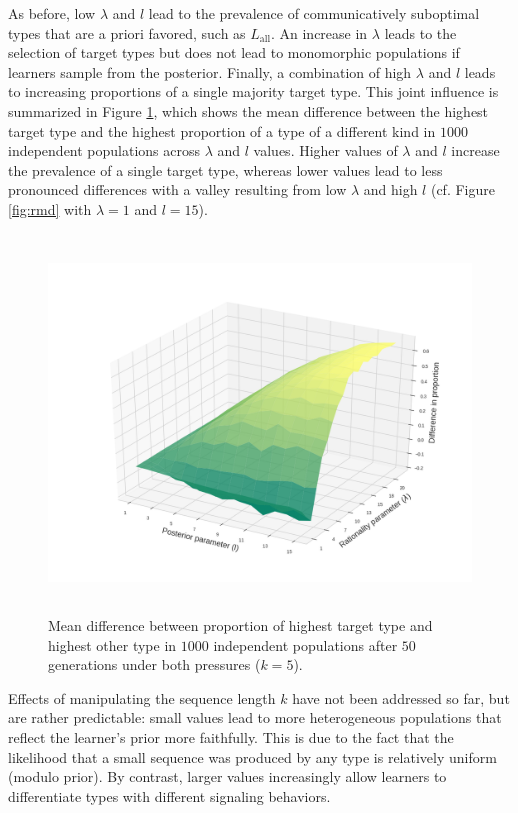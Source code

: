 \documentclass[a4paper, 11pt]{article}
\theoremstyle{Satz}
\newcommand{\mylang}[1]{\ensuremath{L_{\text{#1}}}\xspace} %
\newcommand{\Lall}{\mylang{all}}
\begin{document}
As before, low $\lambda$ and $l$ lead to the prevalence of communicatively suboptimal types
that are a priori favored, such as $\Lall$. An increase in $\lambda$ leads to the selection of
target types but does not lead to monomorphic populations if learners sample from the
posterior. Finally, a combination of high $\lambda$ and $l$ leads to increasing proportions of
a single majority target type. This joint influence is summarized in Figure \ref{fig:diff}, which shows the mean difference between the highest target type and the highest proportion of a type of a different kind in $1000$ independent populations across $\lambda$ and $l$ values. Higher values of $\lambda$ and $l$ increase the prevalence of a single target type, whereas lower values lead to less pronounced differences with a valley resulting from low $\lambda$ and high $l$ (cf. Figure \ref{fig:rmd} with $\lambda = 1$ and $l=15$). 

\begin{figure}[t]
\centering
\includegraphics[width=1\textwidth,height=10cm,keepaspectratio]{./plots/fig4-3d-incumbents-difference} %
\caption{Mean difference between proportion of highest target type and highest other type in
  $1000$ independent populations after $50$ generations under both pressures ($k = 5$).}
\label{fig:diff}
\end{figure}

Effects of manipulating the sequence length $k$ have not been addressed so far, but are rather
predictable: small values lead to more heterogeneous populations that reflect the learner's
prior more faithfully. This is due to the fact that the likelihood that a small sequence was
produced by any type is relatively uniform (modulo prior). By contrast, larger values
increasingly allow learners to differentiate types with different signaling behaviors.
\end{document}
